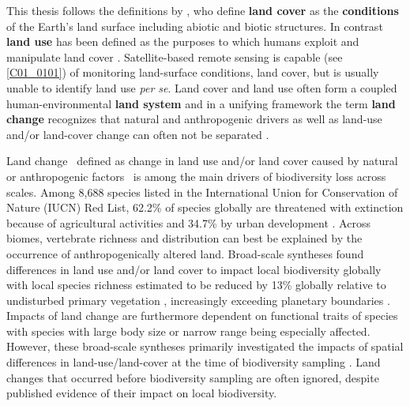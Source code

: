   \vspace{-20pt}
  \begin{center}
        \begin{definitions}[Definitions]
        This thesis follows the definitions by \cite{Lambin2006}, who define \textbf{land cover} as the \textbf{conditions} of the Earth’s land surface including abiotic and biotic structures. In contrast \textbf{land use} has been defined as the purposes to which humans exploit and manipulate land cover \citep{Lambin2006}. Satellite-based remote sensing is capable (see \ref{C01_0101}) of monitoring land-surface conditions, \ie land cover, but is usually unable to identify land use \textit{per se}. Land cover and land use often form a coupled human-environmental \textbf{land system} \citep{Lambin2006,Turner2007} and in a unifying framework the term \textbf{land change} recognizes that natural and anthropogenic drivers as well as land-use and/or land-cover change can often not be separated \citep{Turner2007,Lambin2006}.
        \end{definitions}  
  \end{center}
  \vspace{-20pt}

Land change \textendash\ defined as change in land use and/or land cover caused by natural or anthropogenic factors \citep[Box 1.1, ][]{Lambin2003,Turner2007,Song2018} \textendash\ is among the main drivers of biodiversity loss across scales. Among 8,688 species listed in the International Union for Conservation of Nature (IUCN) Red List, 62.2\% of species globally are threatened with extinction because of agricultural activities and 34.7\% by urban development \citep{Maxwell2016}. Across biomes, vertebrate richness \citep{Brum2013,Kehoe2017} and distribution \citep{DiMarco2015} can best be explained by the occurrence of anthropogenically altered land. Broad-scale syntheses found differences in land use and/or land cover to impact local biodiversity globally \citep{Gibson2011,Murphy2014,Newbold2014b,Newbold2015,Alroy2017} with local species richness estimated to be reduced by 13\% globally relative to undisturbed primary vegetation \citep{Newbold2015}, increasingly exceeding planetary boundaries \citep{Newbold2016}. Impacts of land change are furthermore dependent on functional traits of species \citep{Newbold2013,Jung2016} with species with large body size \citep{Newbold2013,Newbold2015} or narrow range \citep{Newbold2018} being especially affected. However, these broad-scale syntheses primarily investigated the impacts of spatial differences in land-use/land-cover at the time of biodiversity sampling \citep{Gibson2011,Murphy2014,Newbold2015,Alroy2017}. Land changes that occurred before biodiversity sampling are often ignored, despite published evidence of their impact on local biodiversity.

